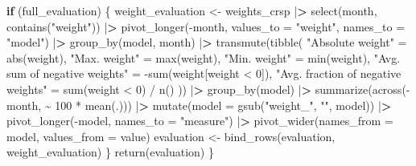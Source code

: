 \documentclass[
]{krantz}
\newenvironment{Shaded}{\begin{snugshade}}{\end{snugshade}}
\newcommand{\AttributeTok}[1]{\textcolor[rgb]{0.61,0.61,0.61}{#1}}
\newcommand{\ControlFlowTok}[1]{\textcolor[rgb]{0.27,0.27,0.27}{\textbf{#1}}}
\newcommand{\DecValTok}[1]{\textcolor[rgb]{0.06,0.06,0.06}{#1}}
\newcommand{\ErrorTok}[1]{\textcolor[rgb]{0.14,0.14,0.14}{\textbf{#1}}}
\newcommand{\FunctionTok}[1]{\textcolor[rgb]{0,0,0}{#1}}
\newcommand{\NormalTok}[1]{#1}
\newcommand{\OtherTok}[1]{\textcolor[rgb]{0.37,0.37,0.37}{#1}}
\newcommand{\SpecialCharTok}[1]{\textcolor[rgb]{0,0,0}{#1}}
\newcommand{\StringTok}[1]{\textcolor[rgb]{0.5,0.5,0.5}{#1}}
\begin{document}
\begin{Shaded}
\begin{Highlighting}[]
  \ControlFlowTok{if}\NormalTok{ (full\_evaluation) \{}
\NormalTok{    weight\_evaluation }\OtherTok{\textless{}{-}}\NormalTok{ weights\_crsp }\SpecialCharTok{|}\ErrorTok{\textgreater{}}
      \FunctionTok{select}\NormalTok{(month, }\FunctionTok{contains}\NormalTok{(}\StringTok{"weight"}\NormalTok{)) }\SpecialCharTok{|}\ErrorTok{\textgreater{}}
      \FunctionTok{pivot\_longer}\NormalTok{(}\SpecialCharTok{{-}}\NormalTok{month, }\AttributeTok{values\_to =} \StringTok{"weight"}\NormalTok{, }\AttributeTok{names\_to =} \StringTok{"model"}\NormalTok{) }\SpecialCharTok{|}\ErrorTok{\textgreater{}}
      \FunctionTok{group\_by}\NormalTok{(model, month) }\SpecialCharTok{|}\ErrorTok{\textgreater{}}
      \FunctionTok{transmute}\NormalTok{(}\FunctionTok{tibble}\NormalTok{(}
        \StringTok{"Absolute weight"} \OtherTok{=} \FunctionTok{abs}\NormalTok{(weight),}
        \StringTok{"Max. weight"} \OtherTok{=} \FunctionTok{max}\NormalTok{(weight),}
        \StringTok{"Min. weight"} \OtherTok{=} \FunctionTok{min}\NormalTok{(weight),}
        \StringTok{"Avg. sum of negative weights"} \OtherTok{=} \SpecialCharTok{{-}}\FunctionTok{sum}\NormalTok{(weight[weight }\SpecialCharTok{\textless{}} \DecValTok{0}\NormalTok{]),}
        \StringTok{"Avg. fraction of negative weights"} \OtherTok{=} \FunctionTok{sum}\NormalTok{(weight }\SpecialCharTok{\textless{}} \DecValTok{0}\NormalTok{) }\SpecialCharTok{/} \FunctionTok{n}\NormalTok{()}
\NormalTok{      )) }\SpecialCharTok{|}\ErrorTok{\textgreater{}}
      \FunctionTok{group\_by}\NormalTok{(model) }\SpecialCharTok{|}\ErrorTok{\textgreater{}}
      \FunctionTok{summarize}\NormalTok{(}\FunctionTok{across}\NormalTok{(}\SpecialCharTok{{-}}\NormalTok{month, }\SpecialCharTok{\textasciitilde{}} \DecValTok{100} \SpecialCharTok{*} \FunctionTok{mean}\NormalTok{(.))) }\SpecialCharTok{|}\ErrorTok{\textgreater{}}
      \FunctionTok{mutate}\NormalTok{(}\AttributeTok{model =} \FunctionTok{gsub}\NormalTok{(}\StringTok{"weight\_"}\NormalTok{, }\StringTok{""}\NormalTok{, model)) }\SpecialCharTok{|}\ErrorTok{\textgreater{}}
      \FunctionTok{pivot\_longer}\NormalTok{(}\SpecialCharTok{{-}}\NormalTok{model, }\AttributeTok{names\_to =} \StringTok{"measure"}\NormalTok{) }\SpecialCharTok{|}\ErrorTok{\textgreater{}}
      \FunctionTok{pivot\_wider}\NormalTok{(}\AttributeTok{names\_from =}\NormalTok{ model, }\AttributeTok{values\_from =}\NormalTok{ value)}
\NormalTok{    evaluation }\OtherTok{\textless{}{-}} \FunctionTok{bind\_rows}\NormalTok{(evaluation, weight\_evaluation)}
\NormalTok{  \}}
  \FunctionTok{return}\NormalTok{(evaluation)}
\NormalTok{\}}
\end{Highlighting}
\end{Shaded}
\end{document}
